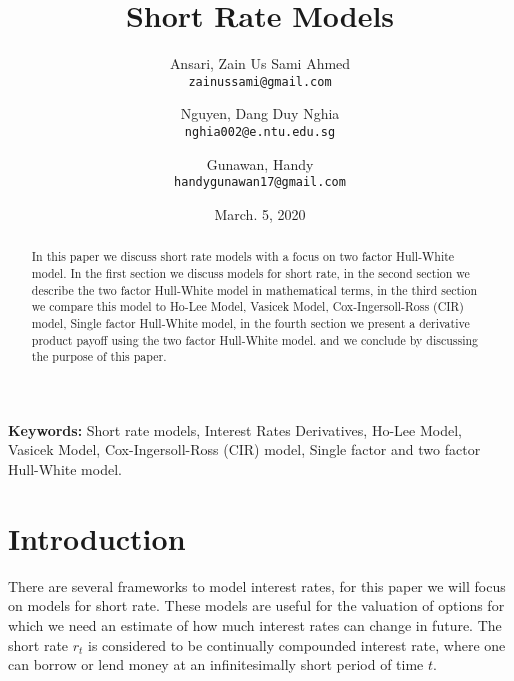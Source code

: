 \documentclass{article}
\begin{document}
\nocite{*} %

\title{Short Rate Models}

\author{
  Ansari, Zain Us Sami Ahmed\\
  \texttt{zainussami@gmail.com}
  \and
  Nguyen, Dang Duy Nghia \\
  \texttt{nghia002@e.ntu.edu.sg}
   \and
  Gunawan, Handy \\
  \texttt{handygunawan17@gmail.com}  
  }

\date{March. 5, 2020} %

\maketitle

\noindent
\textbf{Keywords:} Short rate models, Interest Rates Derivatives,  Ho-Lee Model, Vasicek Model, Cox-Ingersoll-Ross (CIR) model, Single factor and two factor Hull-White model.



\begin{abstract}
In this paper we discuss short rate models with a focus on two factor Hull-White model.  In the first section we discuss models for short rate, in the second section we describe the two factor Hull-White model in mathematical terms, in the third section we compare this model to Ho-Lee Model, Vasicek Model, Cox-Ingersoll-Ross (CIR) model, Single factor Hull-White model,  in the fourth section we present a derivative product payoff using the two factor Hull-White model. and we conclude by discussing the purpose of this paper.  
\end{abstract}

\section{Introduction
}
There are several frameworks to model interest rates, for this paper we will focus on models for short rate.  These models are useful for the valuation of options for which we need an estimate of how much interest rates can change in future.  The short rate $r_t$ is considered to be continually compounded interest rate, where one can borrow or lend money at an infinitesimally short period of time $t$. \\
\end{document}
